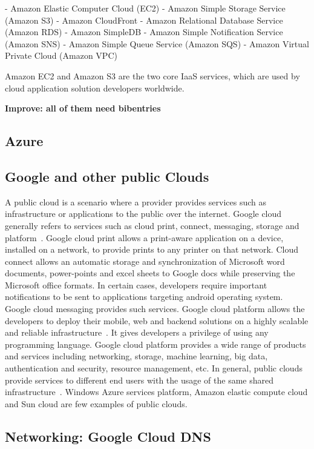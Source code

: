 {     -  Amazon Elastic Computer Cloud (EC2)
     -  Amazon Simple Storage Service (Amazon S3)
     -  Amazon CloudFront
     -  Amazon Relational Database Service (Amazon RDS)
     -  Amazon SimpleDB
     -  Amazon Simple Notification Service (Amazon SNS)
     -  Amazon Simple Queue Service (Amazon SQS)
     -  Amazon Virtual Private Cloud (Amazon VPC)

     Amazon EC2 and Amazon S3 are the two core IaaS services, which
     are used by cloud application solution developers
     worldwide.~\cite{www-aws}

     {\bf Improve: all of them need bibentries}
     
\subsection{Azure}
\subsection{Google and other public Clouds}

A public cloud is a scenario where a provider provides services such
as infrastructure or applications to the public over the
internet. Google cloud generally refers to services such as cloud
print, connect, messaging, storage and platform~\cite{goo1}. Google
cloud print allows a print-aware application on a device, installed on
a network, to provide prints to any printer on that network. Cloud
connect allows an automatic storage and synchronization of Microsoft
word documents, power-points and excel sheets to Google docs while
preserving the Microsoft office formats. In certain cases, developers
require important notifications to be sent to applications targeting
android operating system. Google cloud messaging provides such
services. Google cloud platform allows the developers to deploy their
mobile, web and backend solutions on a highly scalable and reliable
infrastructure~\cite{goo2}. It gives developers a privilege of using
any programming language. Google cloud platform provides a wide range
of products and services including networking, storage, machine
learning, big data, authentication and security, resource management,
etc. In general, public clouds provide services to different end users
with the usage of the same shared infrastructure~\cite{goo3}. Windows
Azure services platform, Amazon elastic compute cloud and Sun cloud
are few examples of public clouds.
     
\subsection{Networking: Google Cloud DNS}

}
